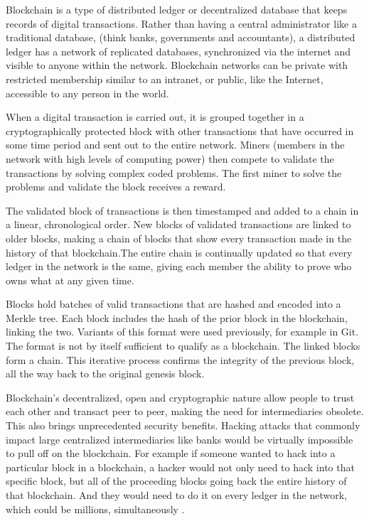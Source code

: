 Blockchain is a type of distributed ledger or decentralized database that keeps records of digital transactions. Rather than having a central administrator like a traditional database, (think banks, governments and accountants), a distributed ledger has a network of replicated databases, synchronized via the internet and visible to anyone within the network. Blockchain networks can be private with restricted membership similar to an intranet, or public, like the Internet, accessible to any person in the world.

When a digital transaction is carried out, it is grouped together in a cryptographically protected block with other transactions that have occurred in some time period and sent out to the entire network. Miners (members in the network with high levels of computing power) then compete to validate the transactions by solving complex coded problems. The first miner to solve the problems and validate the block receives a reward.

The validated block of transactions is then timestamped and added to a chain in a linear, chronological order. New blocks of validated transactions are linked to older blocks, making a chain of blocks that show every transaction made in the history of that blockchain.The entire chain is continually updated so that every ledger in the network is the same, giving each member the ability to prove who owns what at any given time.

Blocks hold batches of valid transactions that are hashed and encoded into a Merkle tree. Each block includes the hash of the prior block in the blockchain, linking the two. Variants of this format were used previously, for example in Git. The format is not by itself sufficient to qualify as a blockchain. The linked blocks form a chain. This iterative process confirms the integrity of the previous block, all the way back to the original genesis block.

Blockchain’s decentralized, open and cryptographic nature allow people to trust each other and transact peer to peer, making the need for intermediaries obsolete. This also brings unprecedented security benefits. Hacking attacks that commonly impact large centralized intermediaries like banks would be virtually impossible to pull off on the blockchain. For example if someone wanted to hack into a particular block in a blockchain, a hacker would not only need to hack into that specific block, but all of the proceeding blocks going back the entire history of that blockchain. And they would need to do it on every ledger in the network, which could be millions, simultaneously \cite{Blockchain2}.

